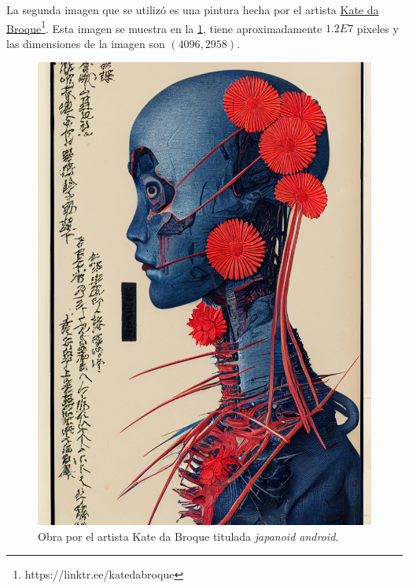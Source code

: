La segunda imagen que se utilizó es una pintura hecha por el artista \href{https://twitter.com/DaBroque}{Kate da Broque}\footnote{https://linktr.ee/katedabroque}. Esta imagen se muestra en la \cref{fig:kate-da-broque}, tiene aproximadamente $1.2E7$ pixeles y las dimensiones de la imagen son $(4096, 2958)$.
\begin{figure}[ht!]
    \centering
    \includegraphics[scale=0.05]{../pictures/kate-da-broque}
    \caption{Obra por el artista Kate da Broque titulada \textit{japanoid android}.}
    \label{fig:kate-da-broque}
\end{figure}

